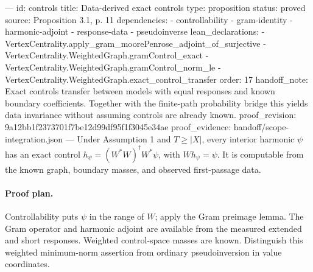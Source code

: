 ---
id: controls
title: Data-derived exact controls
type: proposition
status: proved
source: Proposition 3.1, p. 11
dependencies:
- controllability
- gram-identity
- harmonic-adjoint
- response-data
- pseudoinverse
lean_declarations:
- VertexCentrality.apply_gram_moorePenrose_adjoint_of_surjective
- VertexCentrality.WeightedGraph.gramControl_exact
- VertexCentrality.WeightedGraph.gramControl_norm_le
- VertexCentrality.WeightedGraph.exact_control_transfer
order: 17
handoff_note: Exact controls transfer between models with equal responses and known boundary coefficients. Together with the finite-path probability bridge this yields data invariance without assuming controls are already known.
proof_revision: 9a12bb1f2373701f7be12d99df95f1f3045e34ae
proof_evidence: handoff/scope-integration.json
---
Under Assumption 1 and $T\geq|X|$, every interior harmonic $\psi$ has an exact control $h_\psi=(W^*W)^\dagger W^*\psi$, with $Wh_\psi=\psi$. It is computable from the known graph, boundary masses, and observed first-passage data.

\paragraph{Proof plan.}
Controllability puts $\psi$ in the range of $W$; apply the Gram preimage lemma. The Gram operator and harmonic adjoint are available from the measured extended and short responses. Weighted control-space masses are known. Distinguish this weighted minimum-norm assertion from ordinary pseudoinversion in value coordinates.
